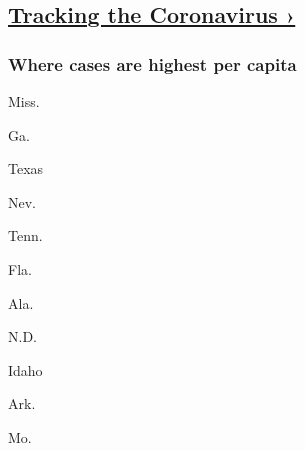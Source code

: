 \hypertarget{tracking-the-coronavirus-}{%
\subsection{\texorpdfstring{\href{https://www.nytimes3xbfgragh.onion/interactive/2020/us/coronavirus-us-cases.html}{Tracking
the Coronavirus
›}}{Tracking the Coronavirus ›}}\label{tracking-the-coronavirus-}}

\href{https://www.nytimes3xbfgragh.onion/interactive/2020/us/coronavirus-us-cases.html}{}

\hypertarget{where-cases-are-highest-per-capita}{%
\subsubsection{\texorpdfstring{Where cases are \textbf{highest} per
capita}{Where cases are highest per capita}}\label{where-cases-are-highest-per-capita}}

\href{https://www.nytimes3xbfgragh.onion/interactive/2020/us/mississippi-coronavirus-cases.html}{}

Miss.
\href{https://www.nytimes3xbfgragh.onion/interactive/2020/us/georgia-coronavirus-cases.html}{}

Ga.
\href{https://www.nytimes3xbfgragh.onion/interactive/2020/us/texas-coronavirus-cases.html}{}

Texas
\href{https://www.nytimes3xbfgragh.onion/interactive/2020/us/nevada-coronavirus-cases.html}{}

Nev.
\href{https://www.nytimes3xbfgragh.onion/interactive/2020/us/tennessee-coronavirus-cases.html}{}

Tenn.
\href{https://www.nytimes3xbfgragh.onion/interactive/2020/us/florida-coronavirus-cases.html}{}

Fla.
\href{https://www.nytimes3xbfgragh.onion/interactive/2020/us/alabama-coronavirus-cases.html}{}

Ala.
\href{https://www.nytimes3xbfgragh.onion/interactive/2020/us/north-dakota-coronavirus-cases.html}{}

N.D.
\href{https://www.nytimes3xbfgragh.onion/interactive/2020/us/idaho-coronavirus-cases.html}{}

Idaho
\href{https://www.nytimes3xbfgragh.onion/interactive/2020/us/arkansas-coronavirus-cases.html}{}

Ark.
\href{https://www.nytimes3xbfgragh.onion/interactive/2020/us/missouri-coronavirus-cases.html}{}

Mo.
\href{https://www.nytimes3xbfgragh.onion/interactive/2020/us/california-coronavirus-cases.html}{}

